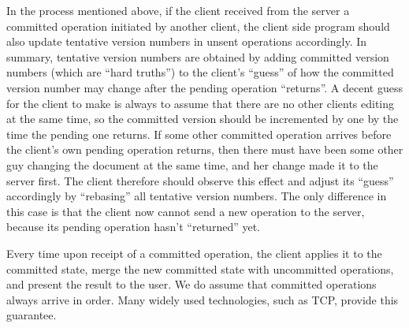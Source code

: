 In the process mentioned above, if the client received from the server a
committed operation initiated by another client, the client side program should
also update tentative version numbers in unsent operations accordingly. In
summary, tentative version numbers are obtained by adding committed version
numbers (which are ``hard truths'') to the client's ``guess'' of how the
committed version number may change after the pending operation ``returns''. A
decent guess for the client to make is always to assume that there are no other
clients editing at the same time, so the committed version should be incremented
by one by the time the pending one returns. If some other committed operation
arrives before the client's own pending operation returns, then there must have
been some other guy changing the document at the same time, and her change made
it to the server first. The client therefore should observe this effect and
adjust its ``guess'' accordingly by ``rebasing'' all tentative version numbers.
The only difference in this case is that the client now cannot send a new
operation to the server, because its pending operation hasn't ``returned'' yet.

Every time upon receipt of a committed operation, the client applies it to the
committed state, merge the new committed state with uncommitted operations, and
present the result to the user. We do assume that committed operations always
arrive in order. Many widely used technologies, such as TCP, provide this
guarantee.
